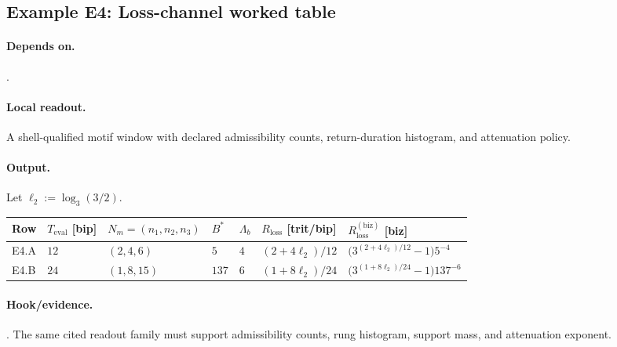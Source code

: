 \subsection{Example E4: Loss-channel worked table}\label{ex:e4}
\paragraph{Depends on.} .
\paragraph{Local readout.} A shell-qualified motif window with declared admissibility counts, return-duration histogram, and attenuation policy.
\paragraph{Output.} Let $\ell_2:=\log_3(3/2)$.
{\footnotesize
\begin{center}
\begin{tabular}{@{}lllllll@{}}
\toprule
Row & $T_{\mathrm{eval}}$ [bip] & $N_m=(n_1,n_2,n_3)$ & $B^*$ & $\Lambda_b$ & $R_{\mathrm{loss}}$ [trit/bip] & $R_{\mathrm{loss}}^{(\mathrm{biz})}$ [biz] \\
\midrule
E4.A & $12$ & $(2,4,6)$ & $5$ & $4$ & $(2+4\ell_2)/12$ & $\bigl(3^{(2+4\ell_2)/12}-1\bigr)5^{-4}$ \\
E4.B & $24$ & $(1,8,15)$ & $137$ & $6$ & $(1+8\ell_2)/24$ & $\bigl(3^{(1+8\ell_2)/24}-1\bigr)137^{-6}$ \\
\bottomrule
\end{tabular}
\end{center}}
\paragraph{Hook/evidence.} . The same cited readout family must support admissibility counts, rung histogram, support mass, and attenuation exponent.
